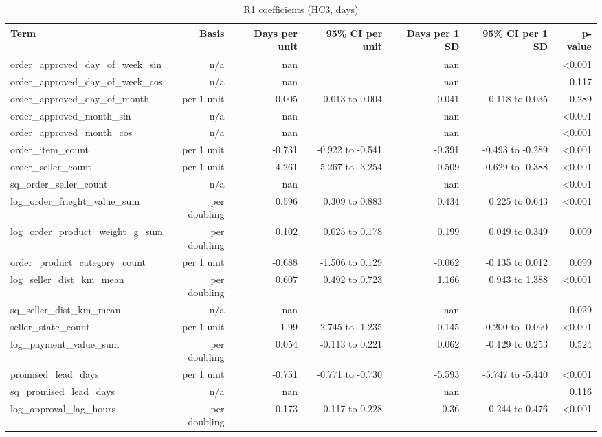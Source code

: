 \begin{table}[htbp]
\centering
\small
\caption{R1 coefficients (HC3, days)}
\begin{tabular}{lrrrrrr}
\toprule
Term & Basis & Days per unit & 95\% CI per unit & Days per 1 SD & 95\% CI per 1 SD & p-value \\
\midrule
order\_approved\_day\_of\_week\_sin & n/a & nan &  & nan &  & <0.001 \\
order\_approved\_day\_of\_week\_cos & n/a & nan &  & nan &  & 0.117 \\
order\_approved\_day\_of\_month & per 1 unit & -0.005 & -0.013 to 0.004 & -0.041 & -0.118 to 0.035 & 0.289 \\
order\_approved\_month\_sin & n/a & nan &  & nan &  & <0.001 \\
order\_approved\_month\_cos & n/a & nan &  & nan &  & <0.001 \\
order\_item\_count & per 1 unit & -0.731 & -0.922 to -0.541 & -0.391 & -0.493 to -0.289 & <0.001 \\
order\_seller\_count & per 1 unit & -4.261 & -5.267 to -3.254 & -0.509 & -0.629 to -0.388 & <0.001 \\
sq\_order\_seller\_count & n/a & nan &  & nan &  & <0.001 \\
log\_order\_frieght\_value\_sum & per doubling & 0.596 & 0.309 to 0.883 & 0.434 & 0.225 to 0.643 & <0.001 \\
log\_order\_product\_weight\_g\_sum & per doubling & 0.102 & 0.025 to 0.178 & 0.199 & 0.049 to 0.349 & 0.009 \\
order\_product\_category\_count & per 1 unit & -0.688 & -1.506 to 0.129 & -0.062 & -0.135 to 0.012 & 0.099 \\
log\_seller\_dist\_km\_mean & per doubling & 0.607 & 0.492 to 0.723 & 1.166 & 0.943 to 1.388 & <0.001 \\
sq\_seller\_dist\_km\_mean & n/a & nan &  & nan &  & 0.029 \\
seller\_state\_count & per 1 unit & -1.99 & -2.745 to -1.235 & -0.145 & -0.200 to -0.090 & <0.001 \\
log\_payment\_value\_sum & per doubling & 0.054 & -0.113 to 0.221 & 0.062 & -0.129 to 0.253 & 0.524 \\
promised\_lead\_days & per 1 unit & -0.751 & -0.771 to -0.730 & -5.593 & -5.747 to -5.440 & <0.001 \\
sq\_promised\_lead\_days & n/a & nan &  & nan &  & 0.116 \\
log\_approval\_lag\_hours & per doubling & 0.173 & 0.117 to 0.228 & 0.36 & 0.244 to 0.476 & <0.001 \\

\end{tabular}
\end{table}
